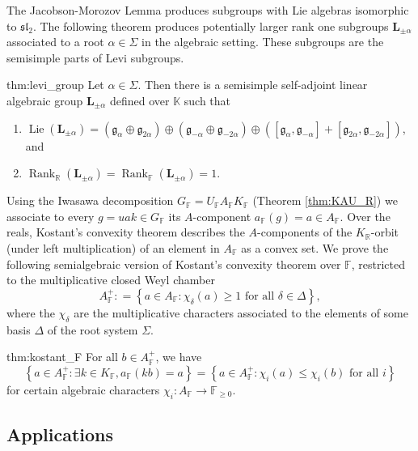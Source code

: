 \documentclass[12pt]{amsart}
\newcommand{\F}{\mathbb{F} }
\newcommand{\R}{\mathbb{R} }
\newcommand{\K}{\mathbb{K}}
\newcommand{\frakg}{\mathfrak{g}}
\newcommand{\Ap}{A^+}
\newcommand{\ApF}{A_\F^+}
\newcommand{\bL}{\mathbf{L}}
\numberwithin{equation}{section}
\theoremstyle{remark} %
\begin{document}
	
	The Jacobson-Morozov Lemma produces subgroups with Lie algebras isomorphic to $\mathfrak{sl}_2$. The following theorem produces potentially larger rank one subgroups $\bL_{\pm \alpha}$ associated to a root $\alpha \in \Sigma$ in the algebraic setting. These subgroups are the semisimple parts of Levi subgroups. %
	\begin{reptheorem}{thm:levi_group}
		Let $\alpha \in \Sigma$. Then there is a semisimple self-adjoint linear algebraic group $\bL_{\pm \alpha}$ defined over $\K$ such that
		\begin{enumerate}
			\item [(i)] $\operatorname{Lie}(\bL_{\pm \alpha}) = ( \frakg_\alpha \oplus \frakg_{2\alpha} ) \oplus (\frakg_{-\alpha} \oplus \frakg_{-2\alpha} ) \oplus ( [\frakg_\alpha , \frakg_{-\alpha}] + [\frakg_{2\alpha}, \frakg_{-2\alpha}] )$, and
			\item [(ii)] $\operatorname{Rank}_\R(\bL_{\pm \alpha}) = \operatorname{Rank}_\F(\bL_{\pm \alpha}) = 1$.
		\end{enumerate}
	\end{reptheorem}
	

	
	Using the Iwasawa decomposition $G_\F=U_\F A_\F K_\F$ (Theorem \ref{thm:KAU_R}) we associate to every $g=uak\in G_\F$ its $A$-component $a_\F(g) = a \in A_\F$. Over the reals, Kostant's convexity theorem describes the $A$-components of the $K_\R$-orbit (under left multiplication) of an element in $A_\F$ as a convex set. We prove the following semialgebraic version of Kostant's convexity theorem over $\F$, restricted to the multiplicative closed Weyl chamber
	$$
	\Ap_\F : = \left\{ a \in A_{\F} \colon \chi_\delta(a) \geq 1 \text{ for all } \delta \in \Delta \right\} ,
	$$
	where the $\chi_\delta$ are the multiplicative characters associated to the elements of some basis $\Delta$ of the root system $\Sigma$. 
	
	\begin{reptheorem}{thm:kostant_F}
		For all $b \in \ApF$, we have
		$$
		\left\{ a \in \ApF \colon \exists k \in K_\F , a_\F(kb) = a \right\}
		= \left\{ a\in \ApF \colon \chi_i (a) \leq \chi_i (b) \text{ for all } i \right\}
		$$
		for certain algebraic characters $\chi_i \colon A_\F \to \F_{\geq 0}$.
	\end{reptheorem}
	
	\subsection{Applications}
	
\end{document}
